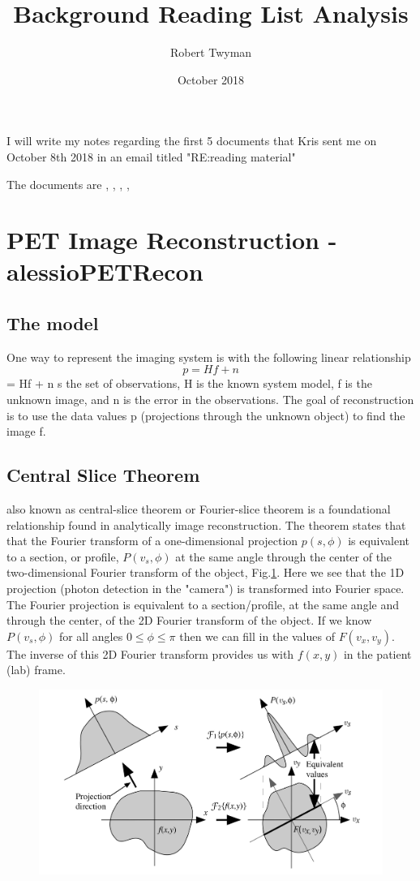 \documentclass{article}
\title{Background Reading List Analysis}
\author{Robert Twyman}
\date{October 2018}
\begin{document}
I will write my notes regarding the first 5 documents that Kris sent me on October 8th 2018 in an email titled "RE:reading material"

The documents are \cite{Alessio2006}, \cite{Bailey2014}, \cite{Zeng2001}, \cite{vanderVos2017}, \cite{Qi2006}

\section{PET Image Reconstruction - 
alessioPETRecon \cite{Alessio2006}}
\subsection{The model}
One way to represent the imaging system is with the following linear relationship
\begin{equation}\label{eq.model}
p = Hf + n 
\end{equation} 
= Hf + n s the set of observations, H is the known system model, f is the unknown image, and n is the error in the observations. The goal of reconstruction is to use the data values p (projections through the unknown object) to find the image f.
\subsection{Central Slice Theorem}
also known as central-slice theorem or Fourier-slice theorem is a foundational relationship found in analytically image reconstruction. The theorem states that that the Fourier transform of a one-dimensional projection $p(s, \phi)$ is equivalent to a section, or profile, $P(v_s,\phi)$ at the same angle through the center of the two-dimensional Fourier transform of the object, Fig.\ref{Fig.Central-Slice}. Here we see that the 1D projection (photon detection in the "camera") is transformed into Fourier space. The Fourier projection is equivalent to a section/profile, at the same angle and through the center, of the 2D Fourier transform of the object. If we know $P(v_s,\phi)$ for all angles $0\leq \phi \leq \pi$ then we can fill in the values of $F(v_x,v_y)$. The inverse of this 2D Fourier transform provides us with $f(x,y)$ in the patient (lab) frame.

\begin{figure} [h]
\centering
	\includegraphics[width=\linewidth]{Background Reading Analysis/Central-section_theorem.png}
    \caption{\label{Fig.Central-Slice}}
\end{figure}
\end{document}
